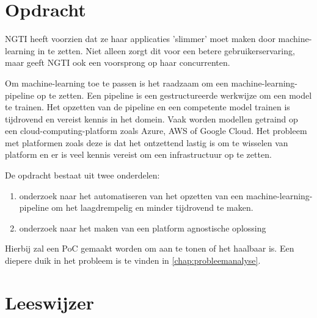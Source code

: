 \section{Opdracht}\label{sec:opdracht}
NGTI heeft voorzien dat ze haar applicaties 'slimmer' moet maken door \gls{machine-learning} in te zetten. Niet alleen zorgt dit voor een betere gebruikerservaring, maar geeft NGTI ook een voorsprong op haar concurrenten.

Om \gls{machine-learning} toe te passen is het raadzaam om een \gls{machine-learning-pipeline} op te zetten. Een pipeline is een gestructureerde werkwijze om een model te trainen. Het opzetten van de pipeline en een competente model trainen is tijdrovend en vereist kennis in het domein. Vaak worden modellen getraind op een \gls{cloud-computing-platform} zoals Azure, AWS of Google Cloud. Het probleem met platformen zoals deze is dat het ontzettend lastig is om te wisselen van platform en er is veel kennis vereist om een infrastructuur op te zetten.\bigskip\bigskip\bigskip

De opdracht bestaat uit twee onderdelen:
\begin{enumerate}
  \item onderzoek naar het automatiseren van het opzetten van een \gls{machine-learning-pipeline} om het laagdrempelig en minder tijdrovend te maken.
  \item onderzoek naar het maken van een platform agnostische oplossing
\end{enumerate}

Hierbij zal een PoC gemaakt worden om aan te tonen of het haalbaar is. Een diepere duik in het probleem is te vinden in \autoref{chap:probleemanalyse}.

\section{Leeswijzer}\label{sec:leeswijzer}
